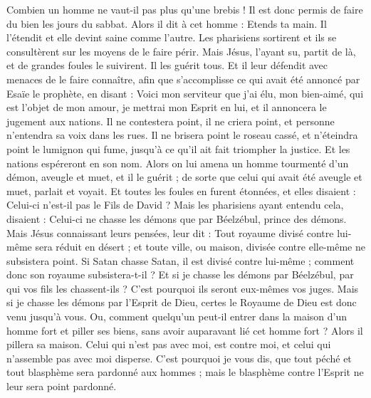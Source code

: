 \begin{multicols}{2}
Combien un homme ne vaut-il pas plus qu'une brebis ! Il est donc permis de faire du bien les jours du sabbat.
Alors il dit à cet homme : Etends ta main. Il l'étendit et elle devint saine comme l'autre.
Les pharisiens sortirent et ils se consultèrent sur les moyens de le faire périr.
Mais Jésus, l'ayant su, partit de là, et de grandes foules le suivirent. Il les guérit tous.
Et il leur défendit avec menaces de le faire connaître,
afin que s'accomplisse ce qui avait été annoncé par Esaïe le prophète, en disant :
Voici mon serviteur que j'ai élu, mon bien-aimé, qui est l'objet de mon amour, je mettrai mon Esprit en lui, et il annoncera le jugement aux nations.
Il ne contestera point, il ne criera point, et personne n'entendra sa voix dans les rues.
Il ne brisera point le roseau cassé, et n'éteindra point le lumignon qui fume, jusqu'à ce qu'il ait fait triompher la justice.
Et les nations espéreront en son nom.
Alors on lui amena un homme tourmenté d'un démon, aveugle et muet, et il le guérit ; de sorte que celui qui avait été aveugle et muet, parlait et voyait.
Et toutes les foules en furent étonnées, et elles disaient : Celui-ci n'est-il pas le Fils de David ?
Mais les pharisiens ayant entendu cela, disaient : Celui-ci ne chasse les démons que par Béelzébul, prince des démons.
Mais Jésus connaissant leurs pensées, leur dit : Tout royaume divisé contre lui-même sera réduit en désert ; et toute ville, ou maison, divisée contre elle-même ne subsistera point.
Si Satan chasse Satan, il est divisé contre lui-même ; comment donc son royaume subsistera-t-il ?
Et si je chasse les démons par Béelzébul, par qui vos fils les chassent-ils ? C'est pourquoi ils seront eux-mêmes vos juges.
Mais si je chasse les démons par l'Esprit de Dieu, certes le Royaume de Dieu est donc venu jusqu'à vous.
Ou, comment quelqu'un peut-il entrer dans la maison d'un homme fort et piller ses biens, sans avoir auparavant lié cet homme fort ? Alors il pillera sa maison.
Celui qui n'est pas avec moi, est contre moi, et celui qui n'assemble pas avec moi disperse.
C'est pourquoi je vous dis, que tout péché et tout blasphème sera pardonné aux hommes ; mais le blasphème contre l'Esprit ne leur sera point pardonné.

\end{multicols}
